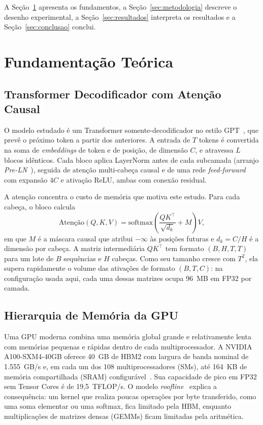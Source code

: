 \documentclass[conference]{IEEEtran}
\begin{document}
A Seção~\ref{sec:fundamentacao} apresenta os fundamentos, a Seção~\ref{sec:metodologia} descreve o desenho experimental, a Seção~\ref{sec:resultados} interpreta os resultados e a Seção~\ref{sec:conclusao} conclui.

\section{Fundamentação Teórica}
\label{sec:fundamentacao}

\subsection{Transformer Decodificador com Atenção Causal}

O modelo estudado é um Transformer somente-decodificador no estilo GPT~\cite{radford2019language}, que prevê o próximo token a partir dos anteriores. A entrada de $T$ tokens é convertida na soma de \textit{embeddings} de token e de posição, de dimensão $C$, e atravessa $L$ blocos idênticos. Cada bloco aplica LayerNorm antes de cada subcamada (arranjo \textit{Pre-LN}~\cite{xiong2020layer}), seguida de atenção multi-cabeça causal e de uma rede \textit{feed-forward} com expansão $4C$ e ativação ReLU, ambas com conexão residual.

A atenção concentra o custo de memória que motiva este estudo. Para cada cabeça, o bloco calcula
\begin{equation}
\text{Atenção}(Q,K,V)=\mathrm{softmax}\!\left(\frac{QK^\top}{\sqrt{d_k}}+M\right)V,
\label{eq:attn}
\end{equation}
em que $M$ é a máscara causal que atribui $-\infty$ às posições futuras e $d_k=C/H$ é a dimensão por cabeça. A matriz intermediária $QK^\top$ tem formato $(B,H,T,T)$ para um lote de $B$ sequências e $H$ cabeças. Como seu tamanho cresce com $T^2$, ela supera rapidamente o volume das ativações de formato $(B,T,C)$: na configuração usada aqui, cada uma dessas matrizes ocupa 96~MB em FP32 por camada.

\subsection{Hierarquia de Memória da GPU}

Uma GPU moderna combina uma memória global grande e relativamente lenta com memórias pequenas e rápidas dentro de cada multiprocessador. A NVIDIA A100-SXM4-40GB oferece 40~GB de HBM2 com largura de banda nominal de 1.555~GB/s e, em cada um dos 108 multiprocessadores (SMs), até 164~KB de memória compartilhada (SRAM) configurável~\cite{nvidia2020a100}. Sua capacidade de pico em FP32 sem Tensor Cores é de 19,5~TFLOP/s. O modelo \textit{roofline}~\cite{williams2009roofline} explica a consequência: um kernel que realiza poucas operações por byte transferido, como uma soma elementar ou uma softmax, fica limitado pela HBM, enquanto multiplicações de matrizes densas (GEMMs) ficam limitadas pela aritmética.
\end{document}
